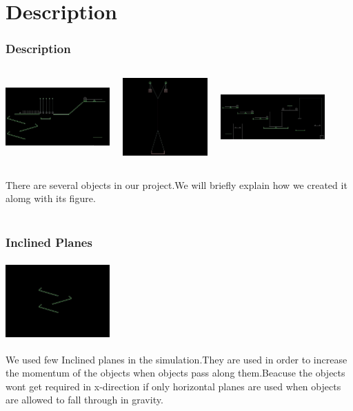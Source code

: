 \documentclass[t,compress,11pt,xcolor=dvipsnames]{beamer}
\begin{document}
\section{Description}
\begin{frame}
\frametitle{Description}
\begin{columns}[t]
\includegraphics[width=4cm,height=3cm]{left.jpg}
\includegraphics[width=4cm,height=3cm]{middle.jpg}
\includegraphics[width=4cm,height=3cm]{right.jpg}
\end{columns}
There are several objects in our project.We will briefly explain how  we created it alomg with its figure. \\~\\
\end{frame}
\begin{frame}
\frametitle{Inclined Planes}
\begin{center}
\includegraphics[width=4cm,height=3cm]{inclinedplanes}
\end{center}
We used few Inclined planes in the simulation.They are used in order to increase the momentum of the objects when objects pass along them.Beacuse the objects wont get required in x-direction if only horizontal planes are used when objects are allowed to fall through in gravity.
\end{frame}
\end{document}
